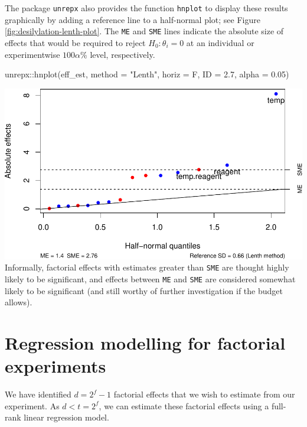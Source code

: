 \documentclass[
]{book}
\newenvironment{Shaded}{\begin{snugshade}}{\end{snugshade}}
\newcommand{\AttributeTok}[1]{\textcolor[rgb]{0.77,0.63,0.00}{#1}}
\newcommand{\FloatTok}[1]{\textcolor[rgb]{0.00,0.00,0.81}{#1}}
\newcommand{\FunctionTok}[1]{\textcolor[rgb]{0.00,0.00,0.00}{#1}}
\newcommand{\NormalTok}[1]{#1}
\newcommand{\SpecialCharTok}[1]{\textcolor[rgb]{0.00,0.00,0.00}{#1}}
\newcommand{\StringTok}[1]{\textcolor[rgb]{0.31,0.60,0.02}{#1}}
\theoremstyle{definition}
\theoremstyle{definition}
\theoremstyle{definition}
\theoremstyle{definition}
\theoremstyle{remark}
\begin{document}
The package \texttt{unrepx} also provides the function \texttt{hnplot} to display these results graphically by adding a reference line to a half-normal plot; see Figure \ref{fig:desilylation-lenth-plot}. The \texttt{ME} and \texttt{SME} lines indicate the absolute size of effects that would be required to reject \(H_0: \theta_i = 0\) at an individual or experimentwise \(100\alpha\)\% level, respectively.

\begin{Shaded}
\begin{Highlighting}[]
\NormalTok{unrepx}\SpecialCharTok{::}\FunctionTok{hnplot}\NormalTok{(eff\_est, }\AttributeTok{method =} \StringTok{"Lenth"}\NormalTok{, }\AttributeTok{horiz =}\NormalTok{ F, }\AttributeTok{ID =} \FloatTok{2.7}\NormalTok{, }\AttributeTok{alpha =} \FloatTok{0.05}\NormalTok{)}
\end{Highlighting}
\end{Shaded}

\includegraphics{bookdown_math3014-6027_files/figure-latex/desilylation-lenth-plot-1.pdf}
Informally, factorial effects with estimates greater than \texttt{SME} are thought highly likely to be significant, and effects between \texttt{ME} and \texttt{SME} are considered somewhat likely to be significant (and still worthy of further investigation if the budget allows).

\hypertarget{fac-reg}{%
\section{Regression modelling for factorial experiments}\label{fac-reg}}

We have identified \(d = 2^f-1\) factorial effects that we wish to estimate from our experiment. As \(d < t = 2^f\), we can estimate these factorial effects using a full-rank linear regression model.
\end{document}
